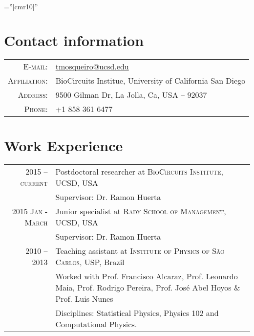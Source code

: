 \documentclass[a4paper,10pt]{article} %
\renewcommand{\emph}{\textbf}
\begin{document}
\pagestyle{empty} %

\font\fb=''[cmr10]'' %


\par{\bigskip\par} %

\section{Contact information}

\begin{tabular}{rl}
  \textsc{E-mail:} & \href{mailto:tmosqueiro@ucsd.edu}{tmosqueiro@ucsd.edu} \\
  \textsc{Affiliation:} & BioCircuits Institue, University of California San Diego \\
  \textsc{Address:} & 9500 Gilman Dr, La Jolla, Ca, USA -- 92037 \\
  \textsc{Phone:} & +1 858 361 6477\\
\end{tabular}


\section{Work Experience}

\begin{tabular}{r|p{11cm}}
  \setlength{\itemsep}{5cm}

  \textsc{2015 -- current} & Postdoctoral researcher at \textsc{BioCircuits Institute}, UCSD, USA \emph{}\\
  & \footnotesize{Supervisor: Dr. Ramon Huerta}

  \vspace{0.2cm}
  \\
  \textsc{2015 Jan - March} & Junior specialist at \textsc{Rady School of Management}, UCSD, USA \emph{}\\
  & \footnotesize{Supervisor: Dr. Ramon Huerta}

  \vspace{0.2cm}
  \\
  \textsc{2010 -- 2013} & Teaching assistant at \textsc{Institute of Physics of S\~ao Carlos}, USP, Brazil\\
  & \footnotesize{Worked with Prof. Francisco Alcaraz, Prof. Leonardo Maia, Prof. Rodrigo Pereira, Prof. Jos\'e Abel Hoyos \& Prof. Luis Nunes}\\
  & \footnotesize{Disciplines: Statistical Physics, Physics 102 and Computational Physics.}

\end{tabular}
\end{document}
